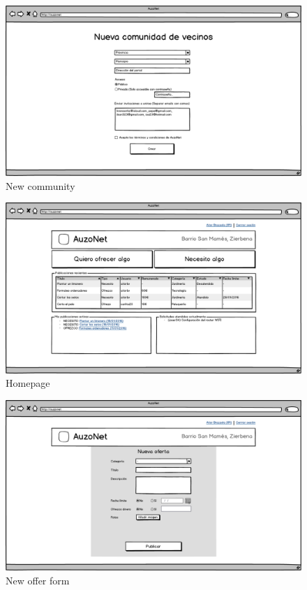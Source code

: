 \documentclass{DeustoFDP}
\begin{document}
\begin{figure}[h]
	\centering
	\includegraphics[width=0.7\linewidth]{fig/mockups/newcommunity}
	\caption[New community]{New community}
	\label{fig:newcommunity}
\end{figure}

\begin{figure}[h]
\centering
\includegraphics[width=0.7\linewidth]{fig/mockups/home}
\caption[Homepage]{Homepage}
\label{fig:home}
\end{figure}

\begin{figure}[h]
\centering
\includegraphics[width=0.7\linewidth]{fig/mockups/newoffer}
\caption[New offer form]{New offer form}
\label{fig:newoffer}
\end{figure}
\end{document}
